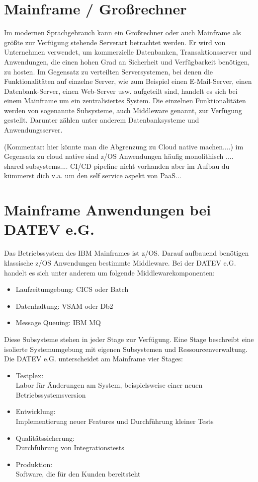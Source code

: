 \section{Mainframe / Großrechner}\label{sec:mainframe}
Im modernen Sprachgebrauch kann ein Großrechner oder auch Mainframe als größte zur Verfügung stehende Serverart betrachtet werden.
Er wird von Unternehmen verwendet, um  kommerzielle Datenbanken, Transaktionsserver und Anwendungen, die einen hohen Grad an Sicherheit und Verfügbarkeit benötigen, zu hosten.
Im Gegensatz zu verteilten Serversystemen, bei denen die Funktionalitäten auf einzelne Server, wie zum Beispiel einen E-Mail-Server, einen Datenbank-Server, einen Web-Server usw. aufgeteilt sind, handelt es sich bei einem Mainframe um ein zentralisiertes System.
Die einzelnen Funktionalitäten werden von sogenannte \glqq Subsysteme\grqq, auch \glqq Middleware\grqq{} genannt, zur Verfügung gestellt.
Darunter zählen unter anderem Datenbanksysteme und Anwendungsserver.

(Kommentar: hier könnte man die Abgrenzung zu Cloud native machen....)
im Gegensatz zu cloud native sind z/OS Anwendungen häufig monolithisch
.... shared subsystems....
CI/CD pipeline nicht vorhanden aber im Aufbau
du kümmerst dich v.a. um den self service aspekt von PaaS...

\cite{Ebbers.2011}

\section{Mainframe Anwendungen bei DATEV e.G.}\label{sec:zosanw}
Das Betriebssystem des IBM Mainframes ist z/OS.
Darauf aufbauend benötigen klassische z/OS Anwendungen bestimmte Middleware.
Bei der DATEV e.G. handelt es sich unter anderem um folgende Middlewarekomponenten:

\begin{itemize}
\item Laufzeitumgebung: CICS oder Batch
\item Datenhaltung: VSAM oder Db2
\item Message Queuing: IBM MQ
\end{itemize}

Diese Subsysteme stehen in jeder Stage zur Verfügung.
Eine Stage beschreibt eine isolierte Systemumgebung mit eigenen Subsystemen und Ressourcenverwaltung.
Die DATEV e.G. unterscheidet am Mainframe vier Stages:
\begin{samepage}
\begin{itemize}
\item Testplex:\\
Labor für Änderungen am System, beispielsweise einer neuen Betriebssystemsversion
\item Entwicklung:\\
Implementierung neuer Features und Durchführung kleiner Tests
\item Qualitätssicherung:\\
Durchführung von Integrationstests
\item Produktion:\\
Software, die für den Kunden bereitsteht
\end{itemize}
\end{samepage}

